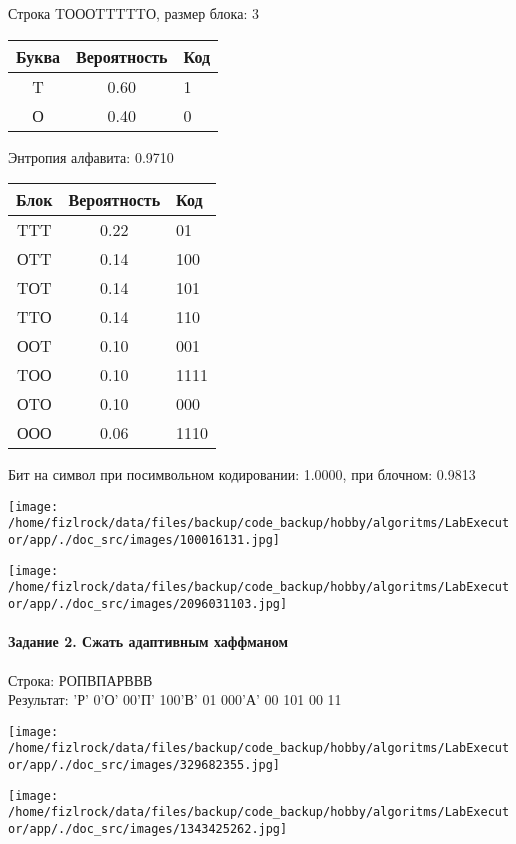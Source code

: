 \documentclass[a4paper, 12pt]{article}
\begin{document}
Строка TОООTTTTTО, размер блока: 3
\begin{center}
 \begin{tabular}{ |c|c|l| } 
  \hline
     Буква & Вероятность & Код\\ \hline
T & 0.60 & 1\\\hline
О & 0.40 & 0
\\ \hline \end{tabular}
\end{center}
Энтропия алфавита: 0.9710
\begin{center}
 \begin{tabular}{ |c|c|l| } 
  \hline
     Блок & Вероятность & Код\\ \hline
TTT & 0.22 & 01\\\hline
ОTT & 0.14 & 100\\\hline
TОT & 0.14 & 101\\\hline
TTО & 0.14 & 110\\\hline
ООT & 0.10 & 001\\\hline
TОО & 0.10 & 1111\\\hline
ОTО & 0.10 & 000\\\hline
ООО & 0.06 & 1110
\\ \hline \end{tabular}
\end{center}
Бит на символ при посимвольном кодировании: 1.0000, при блочном: 0.9813

\texttt{[image: /home/fizlrock/data/files/backup/code\_backup/hobby/algoritms/LabExecutor/app/./doc\_src/images/100016131.jpg]}

\texttt{[image: /home/fizlrock/data/files/backup/code\_backup/hobby/algoritms/LabExecutor/app/./doc\_src/images/2096031103.jpg]}
\pagebreak
\paragraph{Задание 2. Сжать адаптивным хаффманом\\}

Строка: 
РОПВПАРВВВ\\
Результат: 'Р' 0'О' 00'П' 100'В' 01 000'А' 00 101 00 11

\texttt{[image: /home/fizlrock/data/files/backup/code\_backup/hobby/algoritms/LabExecutor/app/./doc\_src/images/329682355.jpg]}

\texttt{[image: /home/fizlrock/data/files/backup/code\_backup/hobby/algoritms/LabExecutor/app/./doc\_src/images/1343425262.jpg]}
\end{document}
